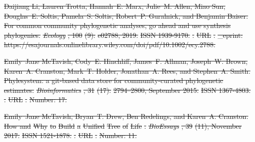 \documentclass[oupdraft]{sysbio_sse}
\providecommand{\DIFdel}[1]{{\protect\color{red}\sout{#1}}}                      %
\begin{document}
\DIFdel{Daijiang Li, Lauren Trotta, Hannah~E. Marx, Julie~M. Allen, Miao Sun,
  Douglas~E. Soltis, Pamela~S. Soltis, Robert~P. Guralnick, and Benjamin
  Baiser.
}%
\DIFdel{For common community phylogenetic analyses, go ahead and use
  synthesis phylogenies.
}%
\emph{\DIFdel{Ecology}}%
\DIFdel{, 100}%
\DIFdel{(9):}%
\DIFdel{e02788, 2019.
}%
\DIFdel{ISSN 1939-9170.
}%
\DIFdel{.
}%
\DIFdel{URL
  }%
\DIFdel{.
}%
\DIFdel{\_eprint:
  https://esajournals.onlinelibrary.wiley.com/doi/pdf/10.1002/ecy.2788.
}%

\DIFdel{Emily~Jane McTavish, Cody~E. Hinchliff, James~F. Allman, Joseph~W. Brown,
  Karen~A. Cranston, Mark~T. Holder, Jonathan~A. Rees, and Stephen~A. Smith.
}%
\DIFdel{Phylesystem: a git-based data store for community-curated
  phylogenetic estimates.
}%
\emph{\DIFdel{Bioinformatics}}%
\DIFdel{, 31}%
\DIFdel{(17):}%
\DIFdel{2794--2800,
  September 2015.
}%
\DIFdel{ISSN 1367-4803.
}%
\DIFdel{.
}%
\DIFdel{URL
  }%
\DIFdel{.
}%
\DIFdel{Number: 17.
}%

\DIFdel{Emily~Jane McTavish, Bryan~T. Drew, Ben Redelings, and Karen~A. Cranston.
}%
\DIFdel{How and }%
\DIFdel{Why}%
\DIFdel{to }%
\DIFdel{Build}%
\DIFdel{a }%
\DIFdel{Unified}%
\DIFdel{Tree}%
\DIFdel{of }%
\DIFdel{Life}%
\DIFdel{.
}%
\emph{\DIFdel{BioEssays}}%
\DIFdel{, 39}%
\DIFdel{(11), November 2017.
}%
\DIFdel{ISSN 1521-1878.
}%
\DIFdel{.
}%
\DIFdel{URL
  }%
\DIFdel{.
}%
\DIFdel{Number: 11.
}%
\end{document}
